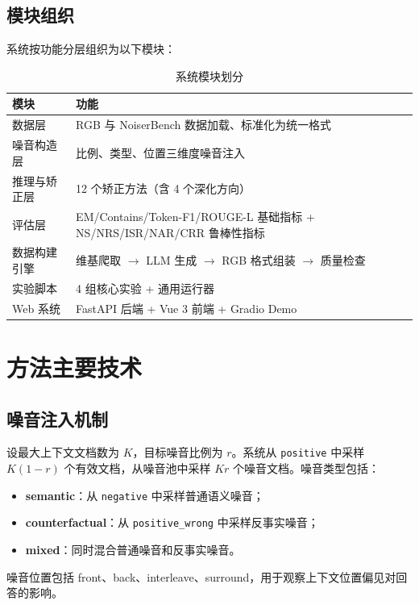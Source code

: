 \documentclass[UTF8,zihao=-4]{ctexart}
\begin{document}
\subsection{模块组织}

系统按功能分层组织为以下模块：

\begin{table}[H]
  \centering
  \caption{系统模块划分}
  \begin{tabularx}{\textwidth}{lY}
    \toprule
    模块 & 功能 \\
    \midrule
    数据层 & RGB 与 NoiserBench 数据加载、标准化为统一格式 \\
    噪音构造层 & 比例、类型、位置三维度噪音注入 \\
    推理与矫正层 & 12 个矫正方法（含 4 个深化方向） \\
    评估层 & EM/Contains/Token-F1/ROUGE-L 基础指标 + NS/NRS/ISR/NAR/CRR 鲁棒性指标 \\
    数据构建引擎 & 维基爬取 $\rightarrow$ LLM 生成 $\rightarrow$ RGB 格式组装 $\rightarrow$ 质量检查 \\
    实验脚本 & 4 组核心实验 + 通用运行器 \\
    Web 系统 & FastAPI 后端 + Vue 3 前端 + Gradio Demo \\
    \bottomrule
  \end{tabularx}
\end{table}

\section{方法主要技术}

\subsection{噪音注入机制}
设最大上下文文档数为 $K$，目标噪音比例为 $r$。系统从 \texttt{positive} 中采样 $K(1-r)$ 个有效文档，从噪音池中采样 $Kr$ 个噪音文档。噪音类型包括：

\begin{itemize}
  \item \textbf{semantic}：从 \texttt{negative} 中采样普通语义噪音；
  \item \textbf{counterfactual}：从 \texttt{positive\_wrong} 中采样反事实噪音；
  \item \textbf{mixed}：同时混合普通噪音和反事实噪音。
\end{itemize}

噪音位置包括 front、back、interleave、surround，用于观察上下文位置偏见对回答的影响。
\end{document}
